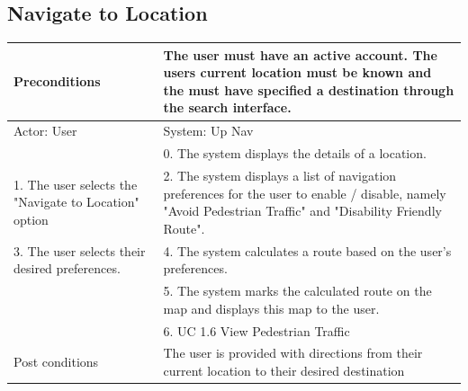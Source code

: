 \documentclass{article}
\begin{document}
\begin{enumerate}
	\subsection{Navigate to Location}

	\centering

	\begin{tabular}{ | m{15em} | m{15em}| }
		\hline 
		Preconditions                                                                                 						& The user must have an active account. The users current location must be known and the must have specified a destination through the search interface. \\ 
		\hline
		Actor: User                                                                                  						& System: Up Nav \\ 
		\hline
                                                                                             									& 0. The system displays the details of a location. \\ 
		\hline
		1. The user selects the "Navigate to Location" option                                        				& 2. The system displays a list of navigation preferences for the user to enable / disable, namely "Avoid Pedestrian Traffic" and "Disability Friendly Route". \\
		\hline
		3. The user selects their desired preferences.                                               				& 4. The system calculates a route based on the user's preferences. \\ 
		\hline
                                                                                            									& 5. The system marks the calculated route on the map and displays this map to the user. \\ 
		\hline
																	& 6. UC 1.6 View Pedestrian Traffic \\
		\hline
		Post conditions                                                                               						& The user is provided with directions from their current location to their desired destination \\ 
		\hline
	\end{tabular}
	

\end{enumerate}
\end{document}

